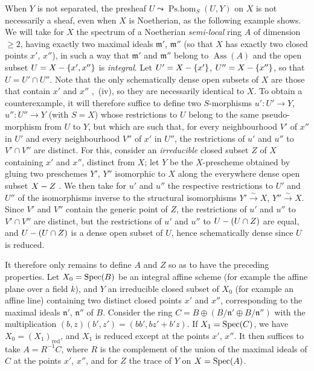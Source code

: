 \begin{remark}[20.2.16]
\label{IV.20.2.16}
When $Y$ is not separated, the presheaf $U\leadsto\operatorname{Ps.hom}_S(U,Y)$ on $X$ is not necessarily a sheaf, even when $X$ is Noetherian, as the following example shows.
We will take for $X$ the spectrum of a Noetherian \emph{semi-local} ring $A$ of dimension $\geq2$, having exactly two maximal
ideals $\mathfrak{m}'$, $\mathfrak{m}''$ (so that $X$ has exactly two closed points $x'$, $x''$), in such a way that $\mathfrak{m}'$ and $\mathfrak{m}''$ belong to $\operatorname{Ass}(A)$ and the open subset $U=X-\{x',x''\}$ is \emph{integral}.
Let $U'=X-\{x'\}$, $U''=X-\{x''\}$, so that $U=U'\cap U''$.
Note that the only schematically dense open subsets of $X$ are those that contain $x'$ and $x''$ ,~(iv), so they are necessarily identical to $X$.
To obtain a counterexample, it will therefore suffice to define two $S$-morphisms $u':U'\to Y$, $u'':U''\to Y$ (with $S=X$) whose restrictions to $U$ belong to the same pseudo-morphism from $U$ to $Y$, but which are such that, for every neighbourhood $V'$ of $x''$ in $U'$ and every neighbourhood $V''$ of $x'$ in $U''$, the restrictions of $u'$ and $u''$ to $V'\cap V''$ are distinct.
For this, consider an \emph{irreducible} closed subset $Z$ of $X$ containing $x'$ and $x''$, distinct from $X$; let $Y$ be the $X$-prescheme obtained by gluing two preschemes $Y'$, $Y''$ isomorphic to $X$ along the everywhere dense open subset $X- Z$ .
We then take for $u'$ and $u''$ the respective restrictions to $U'$ and $U''$ of the isomorphisms inverse to the structural isomorphisms $Y'\xrightarrow{\sim}X$, $Y''\xrightarrow{\sim}X$.
Since $V'$ and $V''$ contain the generic point of $Z$, the restrictions of $u'$ and $u''$ to $V'\cap V''$ are distinct, but the restrictions of $u'$ and $u''$ to $U-(U\cap Z)$ are equal, and $U-(U\cap Z)$ is a dense open subset of $U$, hence schematically dense since $U$ is reduced.

It therefore only remains to define $A$ and $Z$ so as to have the preceding properties.
Let $X_0=\operatorname{Spec}(B)$ be an integral affine scheme (for example the affine plane over a field $k$), and $Y$ an irreducible closed subset of $X_0$ (for example an affine line) containing two distinct closed points $x'$ and $x''$, corresponding to the maximal ideals $\mathfrak{n}'$, $\mathfrak{n}''$ of $B$.
Consider the ring $C=B\oplus(B/\mathfrak{n}'\oplus B/\mathfrak{n}'')$ with the multiplication $(b,z)(b',z')=(bb',bz'+b'z)$.
If $X_1=\operatorname{Spec}(C)$, we have $X_0=(X_1)_\mathrm{red}$, and $X_1$ is reduced except at the points $x'$, $x''$.
It then suffices to take $A=R^{-1}C$, where $R$ is the complement of the union of the maximal ideals of $C$ at the points $x'$, $x''$, and for $Z$ the trace of $Y$ on $X=\operatorname{Spec}(A)$.
\end{remark}


